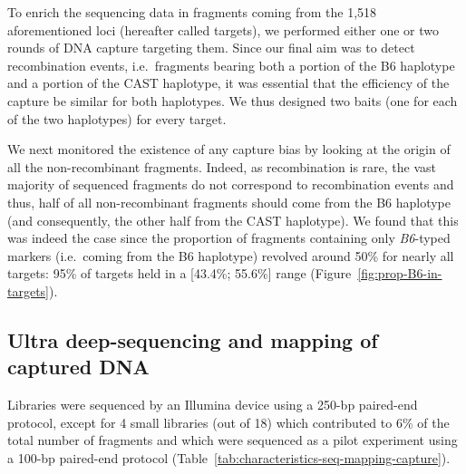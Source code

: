 To enrich the sequencing data in fragments coming from the 1,518 aforementioned loci (hereafter called targets), we performed either one or two rounds of DNA capture targeting them.
Since our final aim was to detect recombination events, i.e.\ fragments bearing both a portion of the B6 haplotype and a portion of the CAST haplotype, it was essential that the efficiency of the capture be similar for both haplotypes.
We thus designed two baits (one for each of the two haplotypes) for every target.

We next monitored the existence of any capture bias by looking at the origin of all the non-recombinant fragments.
Indeed, as recombination is rare, the vast majority of sequenced fragments do not correspond to recombination events and thus, half of all non-recombinant fragments should come from the B6 haplotype (and consequently, the other half from the CAST haplotype).
We found that this was indeed the case since the proportion of fragments containing only \textit{B6}-typed markers (i.e.\ coming from the B6 haplotype) revolved around 50\% for nearly all targets: 95\% of targets held in a [43.4\%; 55.6\%] range (Figure~\ref{fig:prop-B6-in-targets}).






\subsection{Ultra deep-sequencing and mapping of captured DNA}

Libraries were sequenced by an Illumina device using a 250-bp paired-end protocol, except for 4 small libraries (out of 18) which contributed to 6\% of the total number of fragments and which were sequenced as a pilot experiment using a 100-bp paired-end protocol (Table~\ref{tab:characteristics-seq-mapping-capture}). 

